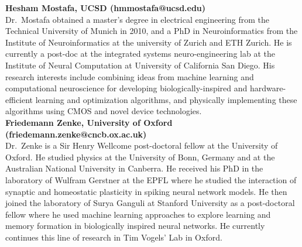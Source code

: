 \documentclass[journal,onecolumn,11pt]{IEEEtran}
\begin{document}
\textbf{Hesham Mostafa, UCSD (hmmostafa@ucsd.edu)}\\
Dr.~Mostafa obtained a master's degree in electrical engineering from the Technical University of Munich in 2010, and a PhD in Neuroinformatics from the Institute of Neuroinformatics at the university of Zurich and ETH Zurich. He is currently a post-doc at the integrated systems neuro-engineering lab at the Institute of Neural Computation at University of California San Diego. His research interests include combining ideas from machine learning and computational neuroscience for developing biologically-inspired and hardware-efficient learning and optimization algorithms, and physically implementing these algorithms using CMOS and novel device technologies.  \\

\textbf{Friedemann Zenke, University of Oxford (friedemann.zenke@cncb.ox.ac.uk)}\\
Dr.~Zenke is a Sir Henry Wellcome post-doctoral fellow at the University of Oxford.
He studied physics at the University of Bonn, Germany and at the Australian National University in Canberra. He received his PhD in the laboratory of Wulfram Gerstner at the EPFL where he studied the interaction of synaptic and homeostatic plasticity in spiking neural network models. He then joined the laboratory of Surya Ganguli at Stanford University as a post-doctoral fellow where he used machine learning approaches to explore learning and memory formation in biologically inspired neural networks. He currently continues this line of research in Tim Vogels' Lab in Oxford.








\end{document}
